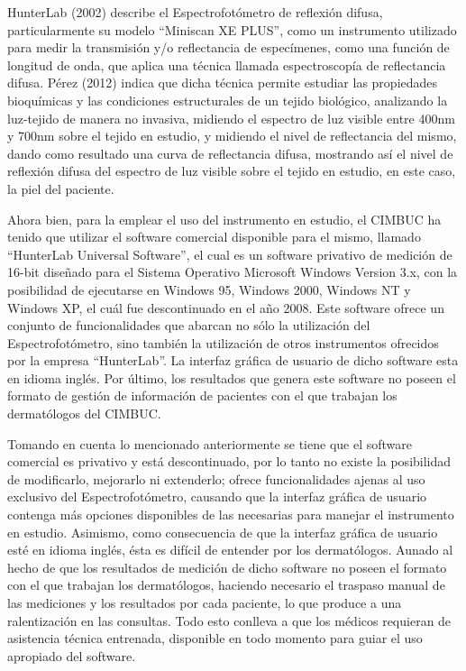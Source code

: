 \documentclass[12pt, a4paper]{article}
\begin{document}
HunterLab (2002) describe el Espectrofot\'{o}metro de reflexi\'{o}n difusa, particularmente su modelo ``Miniscan XE PLUS'', como un instrumento utilizado para medir la transmisi\'{o}n y/o reflectancia de espec\'{i}menes, como una funci\'{o}n de longitud de onda, que aplica una t\'{e}cnica llamada espectroscop\'{i}a de reflectancia difusa. P\'{e}rez (2012) indica que dicha t\'{e}cnica permite estudiar las propiedades bioqu\'{i}micas y las condiciones estructurales de un tejido biol\'{o}gico, analizando la luz-tejido de manera no invasiva, midiendo el espectro de luz visible entre 400nm y 700nm sobre el tejido en estudio, y midiendo el nivel de reflectancia del mismo, dando como resultado una curva de reflectancia difusa, mostrando as\'{i} el nivel de reflexi\'{o}n difusa del espectro de luz visible sobre el tejido en estudio, en este caso, la piel del paciente.

Ahora bien, para la emplear el uso del instrumento en estudio, el CIMBUC ha tenido que utilizar el software comercial disponible para el mismo, llamado ``HunterLab Universal Software'', el cual es un software privativo de medici\'{o}n de 16-bit dise\~{n}ado para el Sistema Operativo Microsoft Windows Version 3.x, con la posibilidad de ejecutarse en Windows 95, Windows 2000, Windows NT y Windows XP, el cu\'{a}l fue descontinuado en el a\~{n}o 2008. Este software ofrece un conjunto de funcionalidades que abarcan no s\'{o}lo la utilizaci\'{o}n del Espectrofot\'{o}metro, sino tambi\'{e}n la utilizaci\'{o}n de otros instrumentos ofrecidos por la empresa ``HunterLab''. La interfaz gr\'{a}fica de usuario de dicho software esta en idioma ingl\'{e}s. Por \'{u}ltimo, los resultados que genera este software no poseen el formato de gesti\'{o}n de informaci\'{o}n de pacientes con el que trabajan los dermat\'{o}logos del CIMBUC.

Tomando en cuenta lo mencionado anteriormente se tiene que el software comercial es privativo y est\'{a} descontinuado, por lo tanto no existe la posibilidad de modificarlo, mejorarlo ni extenderlo; ofrece funcionalidades ajenas al uso exclusivo del Espectrofot\'{o}metro, causando que la interfaz gr\'{a}fica de usuario contenga m\'{a}s opciones disponibles de las necesarias para manejar el instrumento en estudio. Asimismo, como consecuencia de que la interfaz gr\'{a}fica de usuario est\'{e} en idioma ingl\'{e}s, \'{e}sta es dif\'{i}cil de entender por los dermat\'{o}logos. Aunado al hecho de que los resultados de medici\'{o}n de dicho software no poseen el formato con el que trabajan los dermat\'{o}logos, haciendo necesario el traspaso manual de las mediciones y los resultados por cada paciente, lo que produce a una ralentizaci\'{o}n en las consultas. Todo esto conlleva a que los m\'{e}dicos requieran de asistencia t\'{e}cnica entrenada, disponible en todo momento para guiar el uso apropiado del software.
\end{document}
